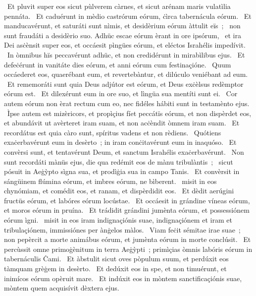 {~Et pluvit super eos sicut pùlverem càrnes, et sicut arénam maris vulatìlia pennáta. 
~Et caduérunt in mèdio castrórum eórum, ċìrca tabernácula eórum. 
~Et manducavérunt, et saturáti sunt nìmis, et desidèrium eórum àttulit eïs~; 
~non sunt fraudáti a desidèrio suo. Adhüc escae eórum èrant in ore ipsórum, 
~et ira Dei asċènsit super eos, et occáesit pìngües eórum, et eléctos Israhélis impedívit. 
~In òmnibus hïs peccavérunt adhüc, et non credidérunt in mirabìlibus ejus. 
~Et defeċérunt in vanitáte dies eórum, et anni eórum cum festinaçióne. 
~Quum occáederet eos, quaerébant eum, et revertebàntur, et dilúculo veniébant ad eum. 
~Et rememoráti sunt quia Deus adjútor est eórum, et Deus exċèlsus redèmptor eórum est. 
~Et dilexérunt eum in ore suo, et lìngüa sua mentíti sunt ei. 
~Cor autem eórum non èrat rectum cum eo, nec fidéles hábiti sunt in testamènto ejus. 
~Ìpse autem est mizèricors, et propìçius fíet peccátïs eórum, et non dispèrdet eos, et abundávit ut avèrteret iram suam, et non acċèndit òmnem iram suam. 
~Et recordátus est quia càro sunt, spíritus vadens et non rèdiens. 
~Quótiens exaċerbavérunt eum in desèrto~; in iram conċitavérunt eum in inaquóso. 
~Et convèrsi sunt, et tentavérunt Deum, et sanctum Israhélis exaċerbavérunt. 
~Non sunt recordáti mànüs ejus, die qua redémit eos de mànu tribulàntis~; 
~sicut pósuit in Aeġỳpto sìgna sua, et prodìġia sua in campo Tanis. 
~Et convèrsit in sángüinem flúmina eórum, et imbres eórum, ne bìberent. 
~misit in eos chynómiam, et comédit eos, et ranam, et dispèrdidit eos. 
~Et dèdit aerúgini fructüs eórum, et labóres eórum locústae. 
~Et occáesit in grándine víneas eórum, et moros eórum in pruína. 
~Et trádidit grándini jumènta eórum, et possessiónem eórum ìgni. 
~misit in eos iram indignaçiónis suae, indignaçiónem et iram et tribulaçiónem, immissiónes per ànġelos màlos. 
~Viam feċit sémitae irae suae~; non pepèrcit a morte animábus eórum, et jumènta eórum in morte conclúsit. 
~Et percùssit omne primoġènitum in terra Aeġỳpti~; primìçias òmnis labóris eórum in tabernáculïs Ċami. 
~Et àbstulit sicut oves pòpulum suum, et perdúxit eos tàmquam grèġem in desèrto. 
~Et dedúxit eos in spe, et non timuérunt, et inimícos eórum opèruit mare. 
~Et indúxit eos in mòntem sanctificaçiónis suae, mòntem quem acquisívit dèxtera ejus. 
}
